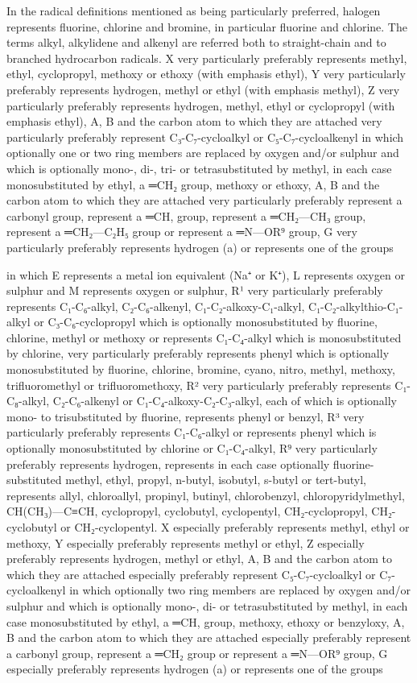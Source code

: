 \documentclass[11pt,a4paper]{article}
\begin{document}
In the radical definitions mentioned as being particularly preferred, halogen represents fluorine, chlorine and bromine, in particular fluorine and chlorine. The terms alkyl, alkylidene and alkenyl are referred both to straight-chain and to branched hydrocarbon radicals. X very particularly preferably represents methyl, ethyl, cyclopropyl, methoxy or ethoxy (with emphasis ethyl), Y very particularly preferably represents hydrogen, methyl or ethyl (with emphasis methyl), Z very particularly preferably represents hydrogen, methyl, ethyl or cyclopropyl (with emphasis ethyl), A, B and the carbon atom to which they are attached very particularly preferably represent C₃-C₇-cycloalkyl or C₅-C₇-cycloalkenyl in which optionally one or two ring members are replaced by oxygen and/or sulphur and which is optionally mono-, di-, tri- or tetrasubstituted by methyl, in each case monosubstituted by ethyl, a ═CH₂ group, methoxy or ethoxy, A, B and the carbon atom to which they are attached very particularly preferably represent a carbonyl group, represent a ═CH, group, represent a ═CH₂—CH₃ group, represent a ═CH₂—C₂H₅ group or represent a ═N—OR⁹ group, G very particularly preferably represents hydrogen (a) or represents one of the groups

in which E represents a metal ion equivalent (Na⁺ or K⁺), L represents oxygen or sulphur and M represents oxygen or sulphur, R¹ very particularly preferably represents C₁-C₆-alkyl, C₂-C₆-alkenyl, C₁-C₂-alkoxy-C₁-alkyl, C₁-C₂-alkylthio-C₁-alkyl or C₃-C₆-cyclopropyl which is optionally monosubstituted by fluorine, chlorine, methyl or methoxy or represents C₁-C₄-alkyl which is monosubstituted by chlorine, very particularly preferably represents phenyl which is optionally monosubstituted by fluorine, chlorine, bromine, cyano, nitro, methyl, methoxy, trifluoromethyl or trifluoromethoxy, R² very particularly preferably represents C₁-C₈-alkyl, C₂-C₆-alkenyl or C₁-C₄-alkoxy-C₂-C₃-alkyl, each of which is optionally mono- to trisubstituted by fluorine, represents phenyl or benzyl, R³ very particularly preferably represents C₁-C₆-alkyl or represents phenyl which is optionally monosubstituted by chlorine or C₁-C₄-alkyl, R⁹ very particularly preferably represents hydrogen, represents in each case optionally fluorine-substituted methyl, ethyl, propyl, n-butyl, isobutyl, s-butyl or tert-butyl, represents allyl, chloroallyl, propinyl, butinyl, chlorobenzyl, chloropyridylmethyl, CH(CH₃)—C≡CH, cyclopropyl, cyclobutyl, cyclopentyl, CH₂-cyclopropyl, CH₂-cyclobutyl or CH₂-cyclopentyl. X especially preferably represents methyl, ethyl or methoxy, Y especially preferably represents methyl or ethyl, Z especially preferably represents hydrogen, methyl or ethyl, A, B and the carbon atom to which they are attached especially preferably represent C₅-C₇-cycloalkyl or C₇-cycloalkenyl in which optionally two ring members are replaced by oxygen and/or sulphur and which is optionally mono-, di- or tetrasubstituted by methyl, in each case monosubstituted by ethyl, a ═CH, group, methoxy, ethoxy or benzyloxy, A, B and the carbon atom to which they are attached especially preferably represent a carbonyl group, represent a ═CH₂ group or represent a ═N—OR⁹ group, G especially preferably represents hydrogen (a) or represents one of the groups
\end{document}
